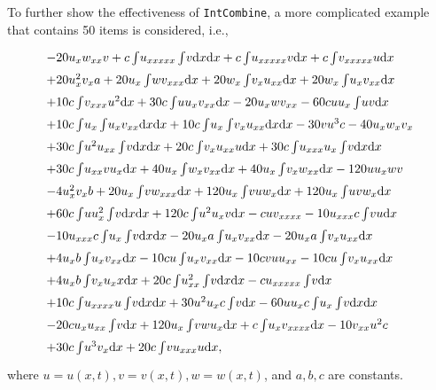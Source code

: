 To further show the effectiveness of \texttt{IntCombine}, a more complicated example that contains 50 items is considered, i.e.,
\begin{equation}
\def\arraystretch{1.5}
\begin{array}{l}
-20u_xw_{xx}v
+c\ii{u_{xxxxx}\ii{v}}
+c\ii{u_{xxxxx}v}
+c\ii{v_{xxxxx}u}\\%
+20u_x^2v_xa
+20u_x\ii{wv_{xxx}}
+20w_x\ii{v_xu_{xx}}
+20w_x\ii{u_xv_{xx}}\\%
+10c\ii{v_{xxx}u^2}
+30c\ii{uu_xv_{xx}}
-20u_xwv_{xx}
-60cuu_x\ii{uv}\\%
+10c\ii{u_x\ii{u_xv_{xx}}}
+10c\ii{u_x\ii{v_xu_{xx}}}
-30vu^3c
-40u_xw_xv_x\\%
+30c\ii{u^2u_{xx}\ii{v}}
+20c\ii{v_xu_{xx}u}
+30c\ii{u_{xxx}u_x\ii{v}}\\%
+30c\ii{u_{xx}vu_x}
+40u_x\ii{w_xv_{xx}}
+40u_x\ii{v_xw_{xx}}
-120uu_xwv\\%
-4u_x^2v_xb
+20u_x\ii{vw_{xxx}}
+120u_x\ii{vuw_x}
+120u_x\ii{uvw_x}\\%
+60c\ii{uu_x^2\ii{v}}
+120c\ii{u^2u_xv}
-cuv_{xxxx}
-10u_{xxx}c\ii{vu}\\%
-10u_{xxx}c\ii{u_x\ii{v}}
-20u_xa\ii{u_xv_{xx}}
-20u_xa\ii{v_xu_{xx}}\\%
+4u_xb\ii{u_xv_{xx}}
-10cu\ii{u_xv_{xx}}
-10c v u u_{xx}
-10cu\ii{v_xu_{xx}}\\%
+4u_xb\ii{v_xu_xx}
+20c\ii{u_{xx}^2\ii{v}}
-cu_{xxxxx}\ii{v}\\%
+10c\ii{u_{xxxx}u\ii{v}}
+30u^2u_xc\ii{v}
-60uu_xc\ii{u_x\ii{v}}\\%
-20cu_xu_{xx}\ii{v}
+120u_x\ii{vwu_x}
+c\ii{u_xv_{xxxx}}
-10v_{xx}u^2c\\%
+30c\ii{u^3v_x}
+20c\ii{vu_{xxx}u},\\%
\end{array}
\label{big50}
\end{equation}
where $u=u(x,t),v=v(x,t),w=w(x,t)$, and $a,b,c$ are constants. 

